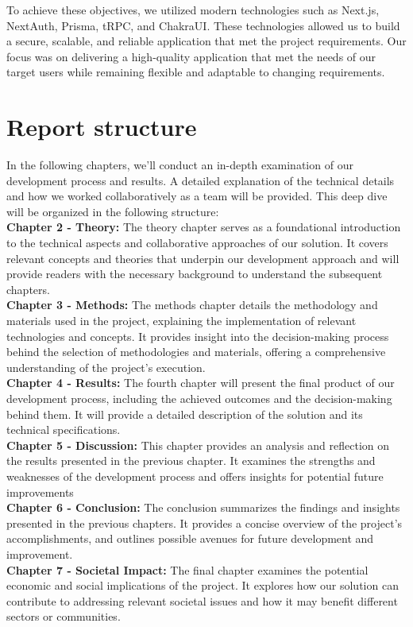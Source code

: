 \noindent
To achieve these objectives, we utilized modern technologies such as Next.js, NextAuth, Prisma, tRPC, and ChakraUI. These technologies allowed us to build a secure, scalable, and reliable application that met the project requirements. Our focus was on delivering a high-quality application that met the needs of our target users while remaining flexible and adaptable to changing requirements. \\

\section{Report structure}

In the following chapters, we'll conduct an in-depth examination of our development process and results. A detailed explanation of the technical details and how we worked collaboratively as a team will be provided. This deep dive will be organized in the following structure: \\

\noindent \textbf{Chapter 2 - Theory:} The theory chapter serves as a foundational introduction to the technical aspects and collaborative approaches of our solution. It covers relevant concepts and theories that underpin our development approach and will provide readers with the necessary background to understand the subsequent chapters.\\

\noindent \textbf{Chapter 3 - Methods:} The methods chapter details the methodology and materials used in the project, explaining the implementation of relevant technologies and concepts. It provides insight into the decision-making process behind the selection of methodologies and materials, offering a comprehensive understanding of the project's execution.\\

\noindent \textbf{Chapter 4 - Results:} The fourth chapter will present the final product of our development process, including the achieved outcomes and the decision-making behind them. It will provide a detailed description of the solution and its technical specifications.\\

\noindent \textbf{Chapter 5 - Discussion:} This chapter provides an analysis and reflection on the results presented in the previous chapter. It examines the strengths and weaknesses of the development process and offers insights for potential future improvements\\

\noindent \textbf{Chapter 6 - Conclusion:} The conclusion summarizes the findings and insights presented in the previous chapters. It provides a concise overview of the project's accomplishments, and outlines possible avenues for future development and improvement.\\

\noindent \textbf{Chapter 7 - Societal Impact:} The final chapter examines the potential economic and social implications of the project. It explores how our solution can contribute to addressing relevant societal issues and how it may benefit different sectors or communities.